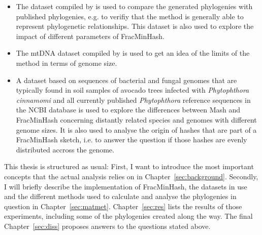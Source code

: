 \begin{itemize}
  \item The dataset compiled by 
  is used to compare the generated phylogenies with published phylogenies, e.g.
  \cite{mandalComparativeGenomeAnalysis2022,yangExpandedPhylogenyGenus2017,abadPhytophthoraTaxonomicPhylogenetic2023a}
  to verifiy that the method is generally able to represent phylogenetic
  relationships. This dataset is also used to explore the impact of
  different parameters of FracMinHash.
  \item The mtDNA dataset compiled by
  \cite{winkworthComparativeAnalysesComplete2022} is used to get an idea of the
  limits of the method in terms of genome size.
  \item A dataset based on sequences of bacterial and fungal genomes that are
  typically found in soil samples of avocado trees infected with
  \textit{Phytophthora cinnamomi} \cite{solis-garciaPhytophthoraRootRot2020} and
  all currently published \textit{Phytophthora} reference sequences in the NCBI
  database is used to explore the differences between Mash and FracMinHash
  concerning distantly related species and genomes with different genome sizes.
  It is also used to analyse the origin of hashes that are part of a FracMinHash
  sketch, i.e. to answer the question if those hashes are evenly distributed
  accross the genome.
\end{itemize}

This thesis is structured as usual: First, I want to introduce the most
important concepts that the actual analysis relies on in
Chapter~\ref{sec:background}. Secondly, I will briefly describe the
implementation of FracMinHash, the datasets in use and the different methods
used to calculate and analyse the phylogenies in question in
Chapter~\ref{sec:matmet}. Chapter~\ref{sec:res} lists the results of those
experiments, including some of the phylogenies created along the way. The final
Chapter~\ref{sec:diss} proposes answers to the questions stated above. 